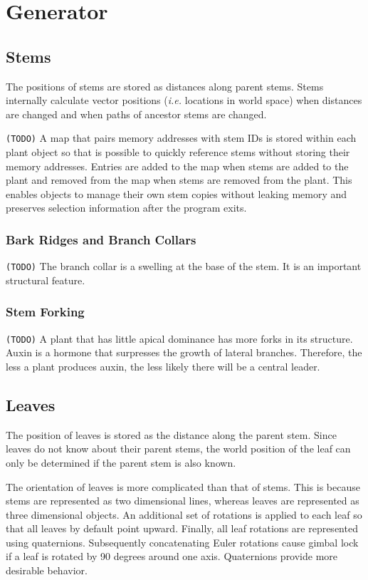 \documentclass[11pt,letterpaper]{article}
\begin{document}
\section{Generator}

\subsection{Stems}

The positions of stems are stored as distances along parent stems. Stems internally calculate vector positions (\textit{i.e.} locations in world space) when distances are changed and when paths of ancestor stems are changed.

\texttt{(TODO)} A map that pairs memory addresses with stem IDs is stored within each plant object so that is possible to quickly reference stems without storing their memory addresses. Entries are added to the map when stems are added to the plant and removed from the map when stems are removed from the plant. This enables objects to manage their own stem copies without leaking memory and preserves selection information after the program exits.

\subsubsection{Bark Ridges and Branch Collars}

\texttt{(TODO)} The branch collar is a swelling at the base of the stem. It is an important structural feature.

\subsubsection{Stem Forking}

\texttt{(TODO)} A plant that has little apical dominance has more forks in its structure. Auxin is a hormone that surpresses the growth of lateral branches. Therefore, the less a plant produces auxin, the less likely there will be a central leader. 

\subsection{Leaves}

The position of leaves is stored as the distance along the parent stem. Since leaves do not know about their parent stems, the world position of the leaf can only be determined if the parent stem is also known.

The orientation of leaves is more complicated than that of stems. This is because stems are represented as two dimensional lines, whereas leaves are represented as three dimensional objects. An additional set of rotations is applied to each leaf so that all leaves by default point upward. Finally, all leaf rotations are represented using quaternions. Subsequently concatenating Euler rotations cause gimbal lock if a leaf is rotated by 90 degrees around one axis. Quaternions provide more desirable behavior.
\end{document}
